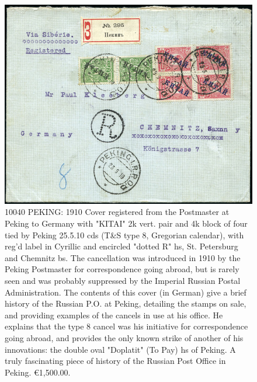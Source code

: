 \begin{figure}[htbp]
\centering
\includegraphics[width=.95\textwidth]{../russian-post-offices-in-china/10040.jpg}
\caption{
10040	PEKING: 1910 Cover registered from the Postmaster at Peking to Germany 
with "KITAI" 2k vert. pair and 4k block of four tied by Peking 25.5.10 cds 
(T\&S type 8, Gregorian calendar), with reg'd label in Cyrillic and encircled 
"dotted R" hs, St. Petersburg and Chemnitz bs.
The cancellation was introduced in 1910 by the Peking Postmaster for 
correspondence going abroad, but is rarely seen and was probably suppressed 
by the Imperial Russian Postal Administration. The contents of this cover 
(in German) give a brief history of the Russian P.O. at Peking, detailing
the stamps on sale, and providing examples of the cancels in use at his office. 
He explains that the type 8 cancel was his initiative for correspondence 
going abroad, and provides the only known strike of another of his 
innovations: the double oval "Doplatit" (To Pay) hs of Peking.
A truly fascinating piece of history of the Russian Post Office in Peking.
\euro 1,500.00. 
}  
\end{figure}  

